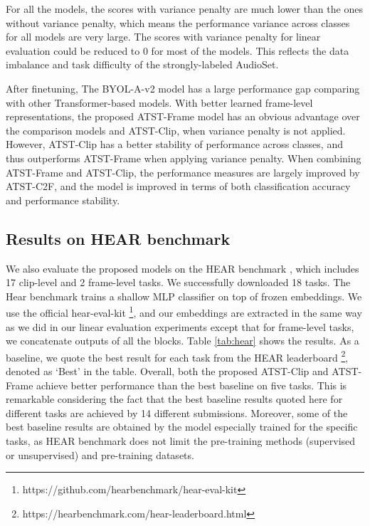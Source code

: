 For all the models, the scores with variance penalty are much lower than the ones without variance penalty, which means the performance variance across classes for all models are very large. The scores with variance penalty for linear evaluation could be reduced to 0 for most of the models. This reflects the data imbalance and task difficulty of the strongly-labeled AudioSet. 


After finetuning, The BYOL-A-v2 model has a large performance gap comparing with other Transformer-based models. 
With better learned frame-level representations, the proposed ATST-Frame model has an obvious advantage over the comparison models and ATST-Clip, when variance penalty is not applied. However, ATST-Clip has a better stability of performance across classes, and thus outperforms ATST-Frame when applying variance penalty. When combining ATST-Frame and ATST-Clip, the performance measures are largely improved by ATST-C2F, and the model is improved in terms of both classification accuracy and performance stability.  




\subsection{Results on HEAR benchmark} We also evaluate the proposed models on the HEAR benchmark \cite{turian_hear_2022}, which includes 17 clip-level and 2 frame-level tasks. We successfully downloaded 18 tasks. The Hear benchmark trains a shallow MLP classifier on top of frozen embeddings. We use the official hear-eval-kit \footnote{https://github.com/hearbenchmark/hear-eval-kit}, and our embeddings are extracted in the same way as we did in our linear evaluation experiments except that for frame-level tasks, we concatenate outputs of all the blocks. 
Table \ref{tab:hear} shows the results. As a baseline, we quote the best result for each task from the HEAR leaderboard \footnote{https://hearbenchmark.com/hear-leaderboard.html}, denoted as `Best' in the table.  Overall, both the proposed ATST-Clip and ATST-Frame achieve better performance than the best baseline on  five tasks. This is remarkable considering the fact that the best baseline results quoted here for different tasks are achieved by 14 different submissions. Moreover, some of the best baseline results are obtained by the model especially trained for the specific tasks, as HEAR benchmark does not limit the pre-training methods (supervised or unsupervised) and pre-training datasets. 

